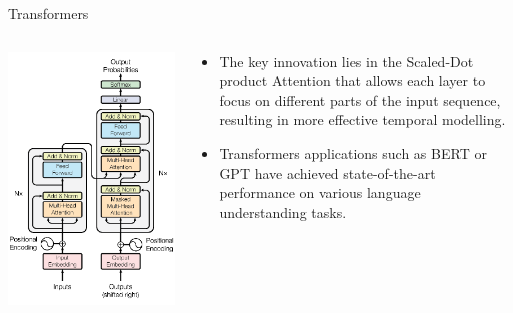 \documentclass{beamer}
\begin{document}
\begin{frame}[fragile]{Transformers}
    \begin{columns}[T]
        \begin{column}{.48\textwidth}
            \begin{center}
                \includegraphics[width=\textwidth,height=0.8\textheight,keepaspectratio]{figures/Transformer-Model.png}
            \end{center}
        \end{column}%
        \hfill%
        \begin{column}{.48\textwidth}
            \begin{itemize}
                \item The key innovation lies in the Scaled-Dot product Attention that allows each layer to focus on different parts of the input sequence, resulting in more effective temporal modelling.
                \item Transformers applications such as BERT or GPT have achieved state-of-the-art performance on various language understanding tasks.
            \end{itemize}
        \end{column}%
    \end{columns}
\end{frame}
\end{document}
